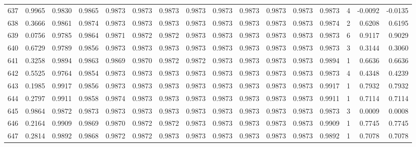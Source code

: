 \begin{tabular}{lrrrrrrrrrrrrrrr}
637 &      0.9965 &  0.9830 &  0.9865 &  0.9873 &  0.9873 &  0.9873 &  0.9873 &  0.9873 &  0.9873 &  0.9873 &   0.9873 &     0.9873 &      4 &                   -0.0092 &                    -0.0135 \\
638 &      0.3666 &  0.9861 &  0.9874 &  0.9873 &  0.9873 &  0.9873 &  0.9873 &  0.9873 &  0.9873 &  0.9873 &   0.9873 &     0.9874 &      2 &                    0.6208 &                     0.6195 \\
639 &      0.0756 &  0.9785 &  0.9864 &  0.9871 &  0.9872 &  0.9872 &  0.9873 &  0.9873 &  0.9873 &  0.9873 &   0.9873 &     0.9873 &      6 &                    0.9117 &                     0.9029 \\
640 &      0.6729 &  0.9789 &  0.9856 &  0.9873 &  0.9873 &  0.9873 &  0.9873 &  0.9873 &  0.9873 &  0.9873 &   0.9873 &     0.9873 &      3 &                    0.3144 &                     0.3060 \\
641 &      0.3258 &  0.9894 &  0.9863 &  0.9869 &  0.9870 &  0.9872 &  0.9872 &  0.9873 &  0.9873 &  0.9873 &   0.9873 &     0.9894 &      1 &                    0.6636 &                     0.6636 \\
642 &      0.5525 &  0.9764 &  0.9854 &  0.9873 &  0.9873 &  0.9873 &  0.9873 &  0.9873 &  0.9873 &  0.9873 &   0.9873 &     0.9873 &      4 &                    0.4348 &                     0.4239 \\
643 &      0.1985 &  0.9917 &  0.9856 &  0.9873 &  0.9873 &  0.9873 &  0.9873 &  0.9873 &  0.9873 &  0.9873 &   0.9873 &     0.9917 &      1 &                    0.7932 &                     0.7932 \\
644 &      0.2797 &  0.9911 &  0.9858 &  0.9874 &  0.9873 &  0.9873 &  0.9873 &  0.9873 &  0.9873 &  0.9873 &   0.9873 &     0.9911 &      1 &                    0.7114 &                     0.7114 \\
645 &      0.9864 &  0.9872 &  0.9873 &  0.9873 &  0.9873 &  0.9873 &  0.9873 &  0.9873 &  0.9873 &  0.9873 &   0.9873 &     0.9873 &      3 &                    0.0009 &                     0.0008 \\
646 &      0.2164 &  0.9909 &  0.9869 &  0.9870 &  0.9872 &  0.9872 &  0.9873 &  0.9873 &  0.9873 &  0.9873 &   0.9873 &     0.9909 &      1 &                    0.7745 &                     0.7745 \\
647 &      0.2814 &  0.9892 &  0.9868 &  0.9872 &  0.9872 &  0.9873 &  0.9873 &  0.9873 &  0.9873 &  0.9873 &   0.9873 &     0.9892 &      1 &                    0.7078 &                     0.7078 \\

\end{tabular}

